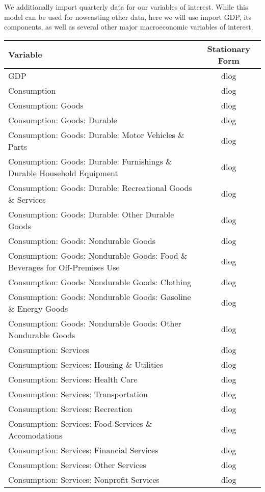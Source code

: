 \documentclass[11pt, letterpaper]{article}\usepackage[]{graphicx}\usepackage[]{color}
\begin{document}
We additionally import quarterly data for our variables of interest. While this model can be used for nowcasting other data, here we will use import GDP, its components, as well as several other major macroeconomic variables of interest.
\begin{table}[H]
\centering
\begingroup\scriptsize
\begin{tabular}{lc}
  \hline
Variable & Stationary Form \\ 
  \hline
GDP & dlog \\ 
  Consumption & dlog \\ 
  Consumption: Goods & dlog \\ 
  Consumption: Goods: Durable & dlog \\ 
  Consumption: Goods: Durable: Motor Vehicles \& Parts & dlog \\ 
  Consumption: Goods: Durable: Furnishings \& Durable Household Equipment & dlog \\ 
  Consumption: Goods: Durable: Recreational Goods \& Services & dlog \\ 
  Consumption: Goods: Durable: Other Durable Goods & dlog \\ 
  Consumption: Goods: Nondurable Goods & dlog \\ 
  Consumption: Goods: Nondurable Goods: Food \& Beverages for Off-Premises Use & dlog \\ 
  Consumption: Goods: Nondurable Goods: Clothing & dlog \\ 
  Consumption: Goods: Nondurable Goods: Gasoline \& Energy Goods & dlog \\ 
  Consumption: Goods: Nondurable Goods: Other Nondurable Goods & dlog \\ 
  Consumption: Services & dlog \\ 
  Consumption: Services: Housing \& Utilities & dlog \\ 
  Consumption: Services: Health Care & dlog \\ 
  Consumption: Services: Transportation & dlog \\ 
  Consumption: Services: Recreation & dlog \\ 
  Consumption: Services: Food Services \& Accomodations & dlog \\ 
  Consumption: Services: Financial Services & dlog \\ 
  Consumption: Services: Other Services & dlog \\ 
  Consumption: Services: Nonprofit Services & dlog \\ 

\end{tabular}
\end{table}
\end{document}
